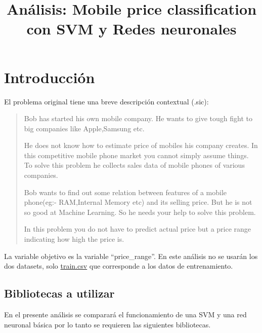 \documentclass[12pt,a4paper,table]{article}
\title{Análisis: Mobile price classification con SVM y Redes neuronales}
\makeatletter
\let\newtitle\@title
\makeatother
\begin{document}
    
    
    

    
    \hypertarget{actividad-clasificaciuxf3n-con-muxe1quina-de-vectores-de-soporte-y-redes-de-neuronas-mobile-price-classification}{%
\textcolor{UnirDark}{\Large\bfseries\newtitle}\label{actividad-clasificaciuxf3n-con-muxe1quina-de-vectores-de-soporte-y-redes-de-neuronas-mobile-price-classification}}

\hypertarget{introducciuxf3n}{%
\section{Introducción}\label{introducciuxf3n}}

El problema original tiene una breve descripción contextual (.sic):

\begin{quote}
Bob has started his own mobile company. He wants to give tough fight to
big companies like Apple,Samsung etc.

He does not know how to estimate price of mobiles his company creates.
In this competitive mobile phone market you cannot simply assume things.
To solve this problem he collects sales data of mobile phones of various
companies.

Bob wants to find out some relation between features of a mobile
phone(eg:- RAM,Internal Memory etc) and its selling price. But he is not
so good at Machine Learning. So he needs your help to solve this
problem.

In this problem you do not have to predict actual price but a price
range indicating how high the price is. \citep{Sharma2018}
\end{quote}

La variable objetivo es la variable ``price\_range''. En este análisis
no se usarán los dos datasets, solo
\href{https://www.kaggle.com/iabhishekofficial/mobile-price-classification\#train.csv}{train.csv}
que corresponde a los datos de entrenamiento.

\hypertarget{bibliotecas-a-utilizar}{%
\subsection{Bibliotecas a utilizar}\label{bibliotecas-a-utilizar}}

En el presente análisis se comparará el funcionamiento de una SVM y una
red neuronal básica por lo tanto se requieren las siguientes
bibliotecas.
\end{document}

